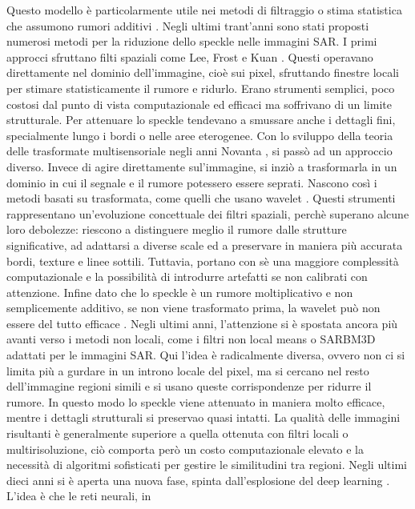 Questo modello è particolarmente utile nei metodi di filtraggio o stima statistica 
che assumono rumori additivi \cite{tutorSpeckle}. 
Negli ultimi trant'anni sono stati proposti numerosi metodi per la riduzione dello speckle nelle immagini SAR.
 I primi approcci sfruttano filti spaziali come Lee, Frost e Kuan \cite{r2024specklenoiseanalysissynthetic}.
Questi operavano direttamente nel dominio dell'immagine, cioè sui pixel, sfruttando finestre locali per stimare
 statisticamente il rumore e ridurlo. Erano strumenti semplici, poco costosi dal punto 
di vista computazionale ed efficaci ma soffrivano di un limite strutturale. Per attenuare lo speckle tendevano a 
smussare anche i dettagli fini, specialmente lungo i bordi o nelle aree eterogenee. 
Con lo sviluppo della teoria delle trasformate multisensoriale negli anni Novanta , si passò ad un approccio diverso. 
Invece di agire direttamente sul'immagine, si inziò a trasformarla in un dominio 
in cui il segnale e il rumore potessero essere seprati. Nascono così i metodi basati su trasformata, come quelli che 
usano wavelet \cite{Argenti2003}  . Questi strumenti rappresentano un'evoluzione concettuale dei filtri spaziali,
perchè superano alcune loro debolezze: riescono a distinguere meglio il rumore dalle strutture significative, ad 
adattarsi a diverse scale ed a preservare in maniera più accurata bordi, texture e linee sottili. 
Tuttavia, portano con sè una maggiore complessità computazionale e la possibilità di introdurre artefatti se non 
calibrati con attenzione. Infine dato che lo speckle è un rumore moltiplicativo e non semplicemente 
additivo, se non viene trasformato prima, la wavelet può non essere del tutto efficace \cite{tutorSpeckle}.
Negli ultimi anni, l'attenzione si è spostata ancora più avanti verso i metodi non locali, come i filtri non local means o 
SARBM3D adattati per le immagini SAR. Qui l'idea è radicalmente diversa, ovvero non ci si limita più a gurdare in un 
introno locale del pixel, ma si cercano nel resto dell'immagine regioni simili e si usano queste 
corrispondenze per ridurre il rumore. In questo modo lo speckle viene attenuato in maniera molto efficace, mentre 
i dettagli strutturali si preservao quasi intatti. La qualità delle immagini risultanti è generalmente
superiore a quella ottenuta con filtri locali o multirisoluzione, ciò comporta però un costo computazionale elevato 
e la necessità di algoritmi sofisticati per gestire le similitudini tra regioni. Negli ultimi dieci 
anni si è aperta una nuova fase, spinta dall'esplosione del deep learning \cite{DL_SAR}. L'idea è che le reti neurali, in 
